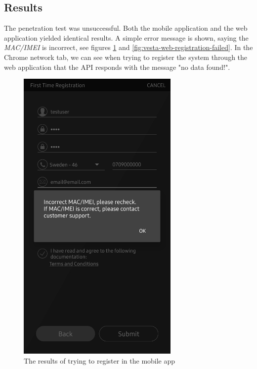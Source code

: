 \subsection{Results}
The penetration test was unsuccessful. Both the mobile application and the web application yielded identical results. A simple error message is shown, saying the \textit{MAC/IMEI} is incorrect, see figures \ref{fig:vesta-home-registration-failed} and \ref{fig:vesta-web-registration-failed}. In the Chrome network tab, we can see when trying to register the system through the web application that the API responds with the message "no data found!".
\begin{figure}[!ht]
    \centering
    \includegraphics[width=0.7\textwidth]{images/6-pentesting/vesta-home-registration-failed.jpg}
    \caption{The results of trying to register in the mobile app}
    \label{fig:vesta-home-registration-failed}
\end{figure}
